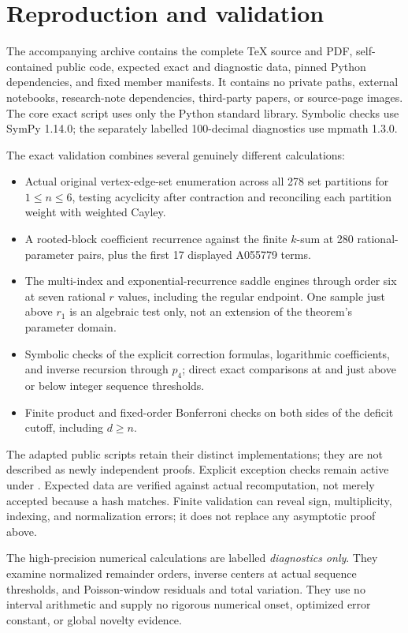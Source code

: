\documentclass[11pt,letterpaper]{article}
\numberwithin{equation}{section}
\theoremstyle{remark}\newtheorem{remark}[theorem]{Remark}
\newcommand{\code}[1]{\texttt{\detokenize{#1}}}
\begin{document}
\section{Reproduction and validation}\label{fat:sec:reproduction}
The accompanying archive contains the complete TeX source and PDF, self-contained public code, expected exact and diagnostic data, pinned Python dependencies, and fixed member manifests. It contains no private paths, external notebooks, research-note dependencies, third-party papers, or source-page images. The core exact script uses only the Python standard library. Symbolic checks use SymPy 1.14.0; the separately labelled 100-decimal diagnostics use mpmath 1.3.0.

The exact validation combines several genuinely different calculations:
\begin{itemize}[leftmargin=*]
\item Actual original vertex-edge-set enumeration across all 278 set partitions for $1\le n\le6$, testing acyclicity after contraction and reconciling each partition weight with weighted Cayley.
\item A rooted-block coefficient recurrence against the finite $k$-sum at 280 rational-parameter pairs, plus the first 17 displayed A055779 terms.
\item The multi-index and exponential-recurrence saddle engines through order six at seven rational $r$ values, including the regular endpoint. One sample just above $r_1$ is an algebraic test only, not an extension of the theorem's parameter domain.
\item Symbolic checks of the explicit correction formulas, logarithmic coefficients, and inverse recursion through $p_4$; direct exact comparisons at and just above or below integer sequence thresholds.
\item Finite product and fixed-order Bonferroni checks on both sides of the deficit cutoff, including $d\ge n$.
\end{itemize}
The adapted public scripts retain their distinct implementations; they are not described as newly independent proofs. Explicit exception checks remain active under \code{python -O}. Expected data are verified against actual recomputation, not merely accepted because a hash matches. Finite validation can reveal sign, multiplicity, indexing, and normalization errors; it does not replace any asymptotic proof above.

The high-precision numerical calculations are labelled \emph{diagnostics only}. They examine normalized remainder orders, inverse centers at actual sequence thresholds, and Poisson-window residuals and total variation. They use no interval arithmetic and supply no rigorous numerical onset, optimized error constant, or global novelty evidence.
\end{document}
